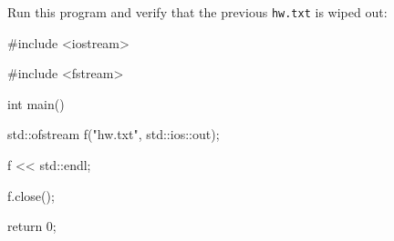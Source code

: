 Run this program and verify that the previous \texttt{hw.txt} is wiped out:



\begin{console}

#include <iostream>

#include <fstream>



int main()

{   

    std::ofstream f("hw.txt", std::ios::out);

    f << std::endl;

    f.close();



    return 0;



}

\end{console}

